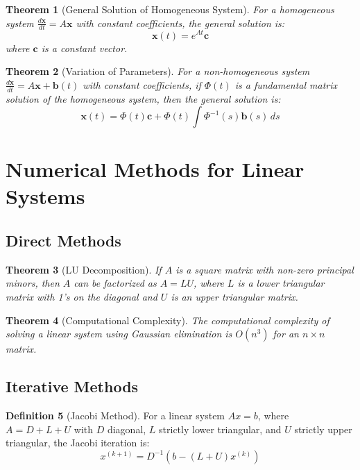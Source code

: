 \documentclass[12pt,a4paper]{article}
\theoremstyle{plain}
\newtheorem{theorem}{Theorem}[section]
\theoremstyle{definition}
\newtheorem{definition}[theorem]{Definition}
\begin{document}
\begin{theorem}[General Solution of Homogeneous System]
For a homogeneous system $\frac{d\mathbf{x}}{dt} = A\mathbf{x}$ with constant coefficients, the general solution is:
\begin{equation}
\mathbf{x}(t) = e^{At}\mathbf{c}
\end{equation}
where $\mathbf{c}$ is a constant vector.
\end{theorem}

\begin{theorem}[Variation of Parameters]
For a non-homogeneous system $\frac{d\mathbf{x}}{dt} = A\mathbf{x} + \mathbf{b}(t)$ with constant coefficients, if $\Phi(t)$ is a fundamental matrix solution of the homogeneous system, then the general solution is:
\begin{equation}
\mathbf{x}(t) = \Phi(t)\mathbf{c} + \Phi(t)\int \Phi^{-1}(s)\mathbf{b}(s) \, ds
\end{equation}
\end{theorem}

\section{Numerical Methods for Linear Systems}

\subsection{Direct Methods}

\begin{theorem}[LU Decomposition]
If $A$ is a square matrix with non-zero principal minors, then $A$ can be factorized as $A = LU$, where $L$ is a lower triangular matrix with 1's on the diagonal and $U$ is an upper triangular matrix.
\end{theorem}

\begin{theorem}[Computational Complexity]
The computational complexity of solving a linear system using Gaussian elimination is $O(n^3)$ for an $n \times n$ matrix.
\end{theorem}

\subsection{Iterative Methods}

\begin{definition}[Jacobi Method]
For a linear system $Ax = b$, where $A = D + L + U$ with $D$ diagonal, $L$ strictly lower triangular, and $U$ strictly upper triangular, the Jacobi iteration is:
\begin{equation}
x^{(k+1)} = D^{-1}(b - (L + U)x^{(k)})
\end{equation}
\end{definition}
\end{document}
